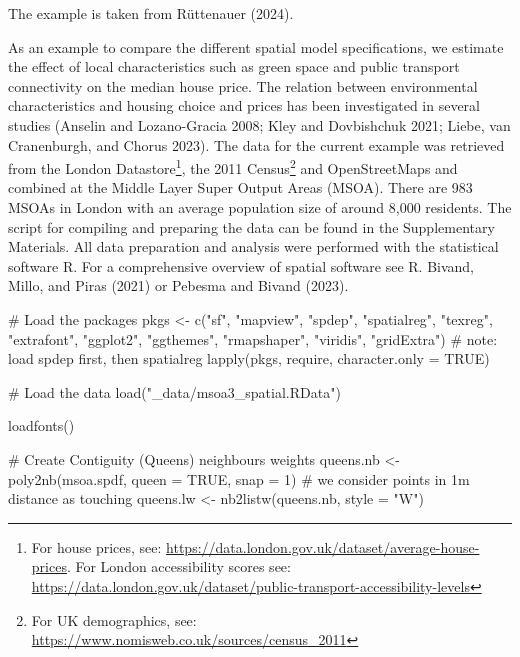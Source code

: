 \documentclass[
  letterpaper,
  DIV=11,
  numbers=noendperiod]{scrreprt}
\newenvironment{Shaded}{\begin{snugshade}}{\end{snugshade}}
\newcommand{\AttributeTok}[1]{\textcolor[rgb]{0.40,0.45,0.13}{#1}}
\newcommand{\CommentTok}[1]{\textcolor[rgb]{0.37,0.37,0.37}{#1}}
\newcommand{\ConstantTok}[1]{\textcolor[rgb]{0.56,0.35,0.01}{#1}}
\newcommand{\DecValTok}[1]{\textcolor[rgb]{0.68,0.00,0.00}{#1}}
\newcommand{\FunctionTok}[1]{\textcolor[rgb]{0.28,0.35,0.67}{#1}}
\newcommand{\NormalTok}[1]{\textcolor[rgb]{0.00,0.23,0.31}{#1}}
\newcommand{\OtherTok}[1]{\textcolor[rgb]{0.00,0.23,0.31}{#1}}
\newcommand{\StringTok}[1]{\textcolor[rgb]{0.13,0.47,0.30}{#1}}
\begin{document}
The example is taken from Rüttenauer (2024).

As an example to compare the different spatial model specifications, we
estimate the effect of local characteristics such as green space and
public transport connectivity on the median house price. The relation
between environmental characteristics and housing choice and prices has
been investigated in several studies (Anselin and Lozano-Gracia 2008;
Kley and Dovbishchuk 2021; Liebe, van Cranenburgh, and Chorus 2023). The
data for the current example was retrieved from the London
Datastore\footnote{For house prices, see:
  \url{https://data.london.gov.uk/dataset/average-house-prices}. For
  London accessibility scores see:
  \url{https://data.london.gov.uk/dataset/public-transport-accessibility-levels}},
the 2011 Census\footnote{For UK demographics, see:
  \url{https://www.nomisweb.co.uk/sources/census_2011}} and
OpenStreetMaps and combined at the Middle Layer Super Output Areas
(MSOA). There are 983 MSOAs in London with an average population size of
around 8,000 residents. The script for compiling and preparing the data
can be found in the Supplementary Materials. All data preparation and
analysis were performed with the statistical software R. For a
comprehensive overview of spatial software see R. Bivand, Millo, and
Piras (2021) or Pebesma and Bivand (2023).

\begin{Shaded}
\begin{Highlighting}[]
\CommentTok{\# Load the packages}
\NormalTok{pkgs }\OtherTok{\textless{}{-}} \FunctionTok{c}\NormalTok{(}\StringTok{"sf"}\NormalTok{, }\StringTok{"mapview"}\NormalTok{, }\StringTok{"spdep"}\NormalTok{, }\StringTok{"spatialreg"}\NormalTok{, }\StringTok{"texreg"}\NormalTok{, }\StringTok{"extrafont"}\NormalTok{,}
          \StringTok{"ggplot2"}\NormalTok{, }\StringTok{"ggthemes"}\NormalTok{, }\StringTok{"rmapshaper"}\NormalTok{, }\StringTok{"viridis"}\NormalTok{, }\StringTok{"gridExtra"}\NormalTok{) }\CommentTok{\# note: load spdep first, then spatialreg}
\FunctionTok{lapply}\NormalTok{(pkgs, require, }\AttributeTok{character.only =} \ConstantTok{TRUE}\NormalTok{)}

\CommentTok{\# Load the data}
\FunctionTok{load}\NormalTok{(}\StringTok{"\_data/msoa3\_spatial.RData"}\NormalTok{)}

\FunctionTok{loadfonts}\NormalTok{()}

\CommentTok{\# Create Contiguity (Queens) neighbours weights}
\NormalTok{queens.nb }\OtherTok{\textless{}{-}} \FunctionTok{poly2nb}\NormalTok{(msoa.spdf, }
                     \AttributeTok{queen =} \ConstantTok{TRUE}\NormalTok{, }
                     \AttributeTok{snap =} \DecValTok{1}\NormalTok{) }\CommentTok{\# we consider points in 1m distance as \textquotesingle{}touching\textquotesingle{}}
\NormalTok{queens.lw }\OtherTok{\textless{}{-}} \FunctionTok{nb2listw}\NormalTok{(queens.nb,}
                      \AttributeTok{style =} \StringTok{"W"}\NormalTok{)}
\end{Highlighting}
\end{Shaded}
\end{document}
